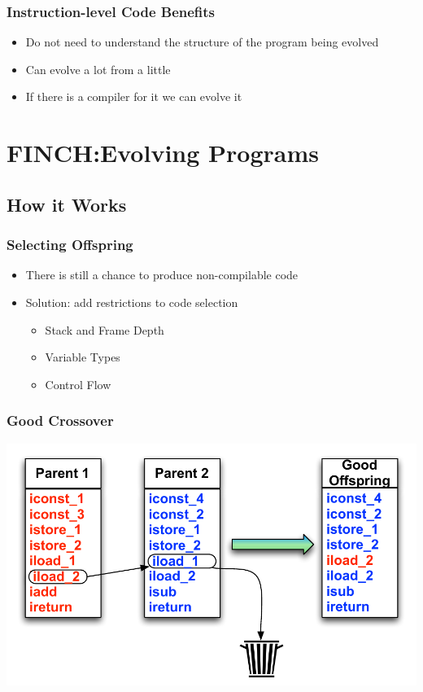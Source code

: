 \documentclass{beamer}
\begin{document}
\begin{frame}
	\frametitle{Instruction-level Code Benefits}
	\begin{itemize}
		\item Do not need to understand the structure of the program being evolved
		\item Can evolve a lot from a little
		\item If there is a compiler for it we can evolve it
	\end{itemize}		

\end{frame}

\section[FINCH]{FINCH:Evolving Programs}

\subsection[How it works]{How it Works}
\begin{frame}
  \frametitle{Selecting Offspring}

  \begin{itemize}
  	\item There is still a chance to produce non-compilable code
	\item Solution: add restrictions to code selection
	\begin{itemize}
	\item Stack and Frame Depth
	\item Variable Types
	\item Control Flow
	\end{itemize}

  \end{itemize}
\end{frame}

\begin{frame}
  \frametitle{Good Crossover}
  \includegraphics[height=.5\textheight]{Illustrations/goodCrossover.pdf}
\end{frame}
\end{document}
